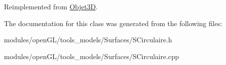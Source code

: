 Reimplemented from \hyperlink{classObjet3D_adeb89dbb10335cd671378377818c1f71}{Objet3\-D}.



The documentation for this class was generated from the following files\-:\begin{DoxyCompactItemize}
\item 
modules/open\-G\-L/tools\-\_\-models/\-Surfaces/S\-Circulaire.\-h\item 
modules/open\-G\-L/tools\-\_\-models/\-Surfaces/S\-Circulaire.\-cpp\end{DoxyCompactItemize}
